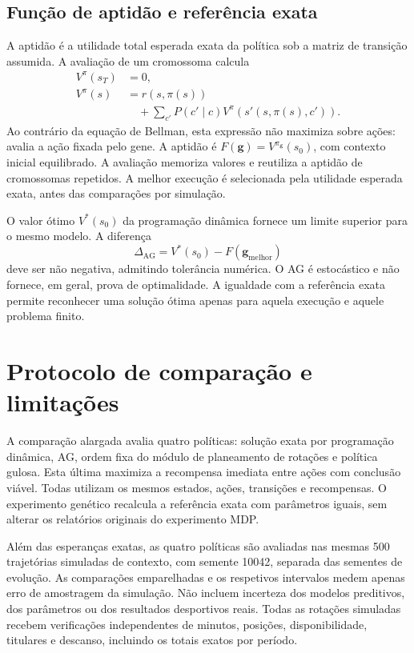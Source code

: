 \subsection{Função de aptidão e referência exata}

A aptidão é a utilidade total esperada exata da política sob a matriz de
transição assumida. A avaliação de um cromossoma calcula
\[
\begin{aligned}
V^{\pi}(s_T)&=0,\\
V^{\pi}(s)&=r(s,\pi(s))\\
&\quad+\sum_{c'}P(c'\mid c)V^{\pi}(s'(s,\pi(s),c')).
\end{aligned}
\]
Ao contrário da equação de Bellman, esta expressão não maximiza sobre
ações: avalia a ação fixada pelo gene. A aptidão é
\(F(\boldsymbol{g})=V^{\pi_{\boldsymbol{g}}}(s_0)\), com contexto inicial
equilibrado. A avaliação memoriza valores e reutiliza a aptidão de
cromossomas repetidos. A melhor execução é selecionada pela utilidade
esperada exata, antes das comparações por simulação.

O valor ótimo \(V^*(s_0)\) da programação dinâmica fornece um limite
superior para o mesmo modelo. A diferença
\[
\Delta_{\mathrm{AG}}=V^*(s_0)-F(\boldsymbol{g}_{\mathrm{melhor}})
\]
deve ser não negativa, admitindo tolerância numérica. O AG é estocástico
e não fornece, em geral, prova de optimalidade. A igualdade com a referência
exata permite reconhecer uma solução ótima apenas para aquela execução
e aquele problema finito.

\section{Protocolo de comparação e limitações}

A comparação alargada avalia quatro políticas: solução exata por programação
dinâmica, AG, ordem fixa do módulo de planeamento de rotações e política gulosa. Esta última
maximiza a recompensa imediata entre ações com conclusão viável.
Todas utilizam os mesmos estados, ações, transições e recompensas.
O experimento genético recalcula a referência exata com parâmetros iguais,
sem alterar os relatórios originais do experimento MDP.

Além das esperanças exatas, as quatro políticas são avaliadas nas mesmas
500 trajetórias simuladas de contexto, com semente 10042, separada das
sementes de evolução. As comparações emparelhadas e os respetivos intervalos
medem apenas erro de amostragem da simulação. Não incluem incerteza dos
modelos preditivos, dos parâmetros ou dos resultados desportivos reais.
Todas as rotações simuladas recebem verificações independentes de minutos,
posições, disponibilidade, titulares e descanso, incluindo os totais
exatos por período.

